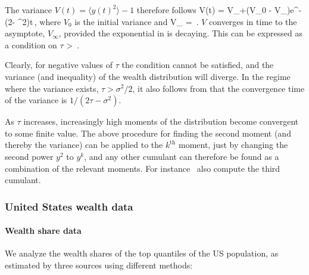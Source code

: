 The variance $V\left(t\right)=\langle y\left(t\right)^2 \rangle-1$ therefore follows
\be
V\left(t\right) = V_{\infty}+\left(V_0 - V_{\infty}\right)e^{-\left(2\tau - \sigma^2\right)t}\,,
\ee
where $V_0$ is the initial variance and
\be
V_{\infty} = \,.
\ee
$V$ converges in time to the asymptote, $V_{\infty}$, provided the exponential in  is decaying. 
This can be expressed as a condition on $\tau$
\be
\tau >  \,.
\ee

Clearly, for negative values of $\tau$ the condition cannot be satisfied, and the variance (and inequality) of the wealth distribution will diverge. 
In the regime where the variance exists, $\tau > \sigma^2/2$, it also follows from  that the convergence time of the variance is $1/\left(2\tau - \sigma^2\right)$.

As $\tau$ increases, increasingly high moments of the distribution become convergent to some finite value. 
The above procedure for finding the second moment (and thereby the variance) can be applied to the $k^\text{th}$ moment, just by changing the second power $y^2$ to $y^k$, and any other cumulant can therefore be found as a combination of the relevant moments. 
For instance~\cite{LiuSerota2016} also compute the third cumulant.


\subsubsection{United States wealth data}

\paragraph{Wealth share data}

We analyze the wealth shares of the top quantiles of the US population, as estimated by three sources using different methods:


